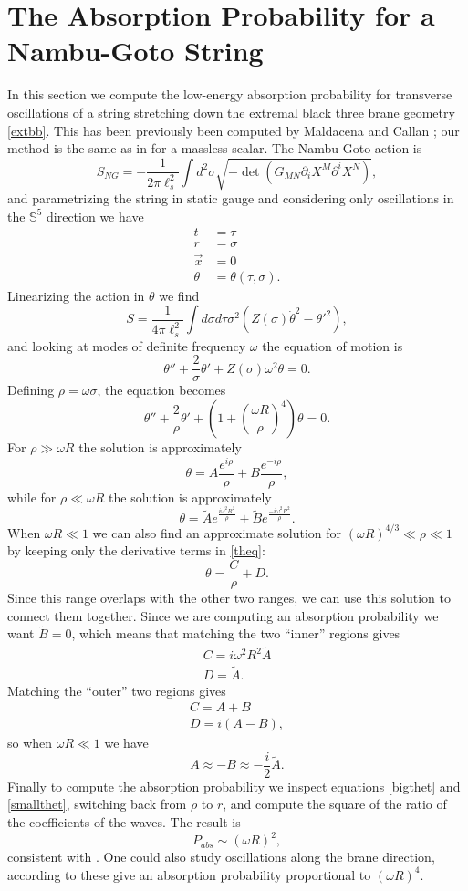 \documentclass[12pt]{article}
\newcommand{\be}{\begin{equation}}
\newcommand{\ee}{\end{equation}}
\begin{document}
\section{The Absorption Probability for a Nambu-Goto String}\label{stringapp}
In this section we compute the low-energy absorption probability for transverse oscillations of a string stretching down the extremal black three brane geometry \eqref{extbb}.  This has been previously been computed by Maldacena and Callan \cite{Callan:1997kz}; our method is the same as in \cite{igor1} for a massless scalar.  The Nambu-Goto action is 
\be
S_{NG}=-\frac{1}{2\pi \ell_s^2}\int d^2\sigma \sqrt{-\det\left(G_{MN}\partial_iX^M\partial^i X^N\right)},
\ee
and parametrizing the string in static gauge and considering only oscillations in the $\mathbb{S}^5$ direction we have
\begin{align}\nonumber
t&=\tau\\\nonumber
r&=\sigma\\\nonumber
\vec{x}&=0\\\nonumber
\theta&=\theta(\tau,\sigma).
\end{align}
Linearizing the action in $\theta$ we find
\be
S=\frac{1}{4\pi\ell_s^2}\int d\sigma d\tau \sigma^2\left(Z(\sigma)\dot{\theta}^2-\theta'^2\right),
\ee
and looking at modes of definite frequency $\omega$ the equation of motion is
\be
\theta''+\frac{2}{\sigma}\theta'+Z(\sigma)\omega^2\theta=0.
\ee
Defining $\rho=\omega \sigma$, the equation becomes
\be\label{theq}
\theta''+\frac{2}{\rho}\theta'+\left(1+\left(\frac{\omega R}{\rho}\right)^4\right)\theta=0.
\ee
For $\rho \gg \omega R$ the solution is approximately
\be\label{bigthet}
\theta=A\frac{e^{i\rho}}{\rho}+B\frac{e^{-i\rho}}{\rho},
\ee
while for $\rho \ll \omega R$ the solution is approximately
\be\label{smallthet}
\theta=\tilde{A}e^{\frac{i\omega^2R^2}{\rho}}+\tilde{B}e^{\frac{-i\omega^2R^2}{\rho}}.
\ee
When $\omega R\ll1$ we can also find an approximate solution for $(\omega R)^{4/3}\ll \rho \ll 1$ by keeping only the derivative terms in \eqref{theq}:
\be
\theta=\frac{C}{\rho}+D.
\ee
Since this range overlaps with the other two ranges, we can use this solution to connect them together.  Since we are computing an absorption probability we want $\tilde{B}=0$, which means that matching the two ``inner'' regions gives 
\begin{align}\nonumber
C=i\omega^2 R^2\tilde{A}\\
D=\tilde{A}.
\end{align}
Matching the ``outer'' two regions gives
\begin{align}\nonumber
C=A+B\\
D=i(A-B),
\end{align}
so when $\omega R\ll1$ we have
\be
A\approx -B\approx-\frac{i}{2}\tilde{A}.
\ee
Finally to compute the absorption probability we inspect equations \eqref{bigthet} and \eqref{smallthet}, switching back from $\rho$ to $r$, and compute the square of the ratio of the coefficients of the waves.  The result is
\be
P_{abs}\sim (\omega R)^2,
\ee
consistent with \cite{Callan:1997kz}.  One could also study oscillations along the brane direction, according to \cite{Savvidy:1999wx} these give an absorption probability proportional to $(\omega R)^4$.


\end{document}
